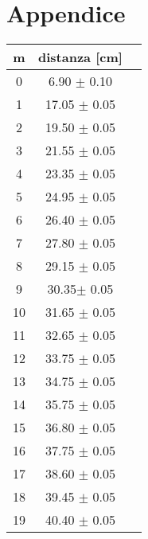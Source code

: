 \newpage
\appendix
\section{Appendice} \label{sec:Appendice}

\begin{table}[H]
	\centering
\begin{tabular}{c|c|c} 
	m & distanza [cm]\\
	\hline
	0& 6.90 $\pm$ 0.10\\
	1& 17.05 $\pm$ 0.05\\
	2& 19.50 $\pm$ 0.05\\
	3& 21.55 $\pm$ 0.05\\
	4& 23.35 $\pm$ 0.05\\
	5& 24.95 $\pm$ 0.05\\
	6& 26.40 $\pm$ 0.05\\
	7& 27.80 $\pm$ 0.05\\
	8& 29.15 $\pm$ 0.05\\
	9& 30.35$\pm$ 0.05\\
	10& 31.65 $\pm$ 0.05\\
	11& 32.65 $\pm$ 0.05\\
	12& 33.75 $\pm$ 0.05\\
	13& 34.75 $\pm$ 0.05\\
	14& 35.75 $\pm$ 0.05\\
	15& 36.80 $\pm$ 0.05\\
	16& 37.75 $\pm$ 0.05\\
	17& 38.60 $\pm$ 0.05\\
	18& 39.45 $\pm$ 0.05\\
	19& 40.40 $\pm$ 0.05\\
\end{tabular}
\label{data}
\end{table}



